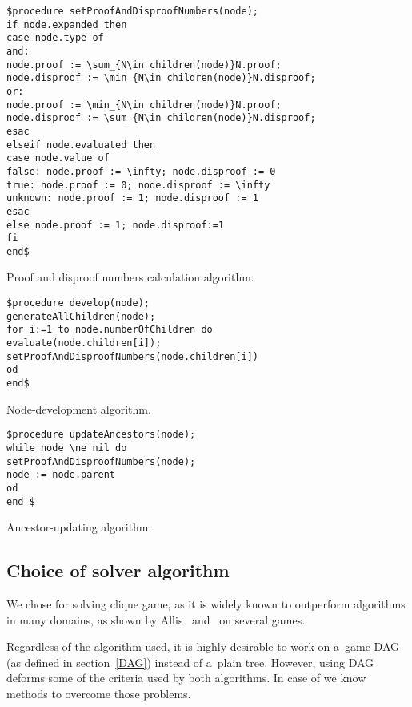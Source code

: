 \begin{table}
\begin{verbatim}
$procedure setProofAndDisproofNumbers(node);
if node.expanded then
case node.type of
and:
node.proof := \sum_{N\in children(node)}N.proof;
node.disproof := \min_{N\in children(node)}N.disproof;
or:
node.proof := \min_{N\in children(node)}N.proof;
node.disproof := \sum_{N\in children(node)}N.disproof;
esac
elseif node.evaluated then
case node.value of
false: node.proof := \infty; node.disproof := 0
true: node.proof := 0; node.disproof := \infty
unknown: node.proof := 1; node.disproof := 1
esac
else node.proof := 1; node.disproof:=1
fi
end$
\end{verbatim}
\caption{Proof and disproof numbers calculation algorithm.}
\label{setProofAndDisproofNumbers}
\end{table}

\begin{table}
\begin{verbatim}
$procedure develop(node);
generateAllChildren(node);
for i:=1 to node.numberOfChildren do
evaluate(node.children[i]);
setProofAndDisproofNumbers(node.children[i])
od
end$
\end{verbatim}
\caption{Node-development algorithm.}
\label{devolopNode}
\end{table}

\begin{table}
\begin{verbatim}
$procedure updateAncestors(node);
while node \ne nil do
setProofAndDisproofNumbers(node);
node := node.parent
od
end $
\end{verbatim}
\caption{Ancestor-updating algorithm.}
\label{updateAncestors}
\end{table}


\subsection{Choice of solver algorithm}

We chose  for solving clique game, as it is widely known to outperform 
algorithms in many domains, as shown by Allis~\cite{allis} and~\cite{divne} on several games. 

Regardless of the algorithm used, it is highly desirable to work on a~game DAG
(as defined in section~\ref{DAG}) instead of a~plain tree. However, using DAG deforms some
of the criteria used by both algorithms. In case of  we know methods to
overcome those problems.

